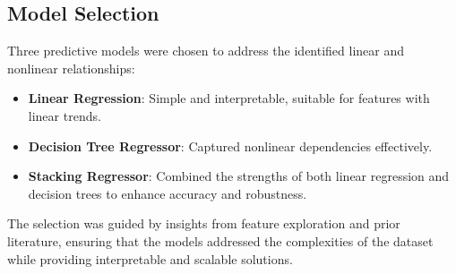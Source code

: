 \documentclass[10pt,twocolumn]{article}
\begin{document}
\begin{itemize}
\subsection{Model Selection}
Three predictive models were chosen to address the identified linear and nonlinear relationships:
\begin{itemize}
    \item \textbf{Linear Regression}: Simple and interpretable, suitable for features with linear trends.
    \item \textbf{Decision Tree Regressor}: Captured nonlinear dependencies effectively.
    \item \textbf{Stacking Regressor}: Combined the strengths of both linear regression and decision trees to enhance accuracy and robustness.
\end{itemize}
The selection was guided by insights from feature exploration and prior literature, ensuring that the models addressed the complexities of the dataset while providing interpretable and scalable solutions.


\end{itemize}
\end{document}
